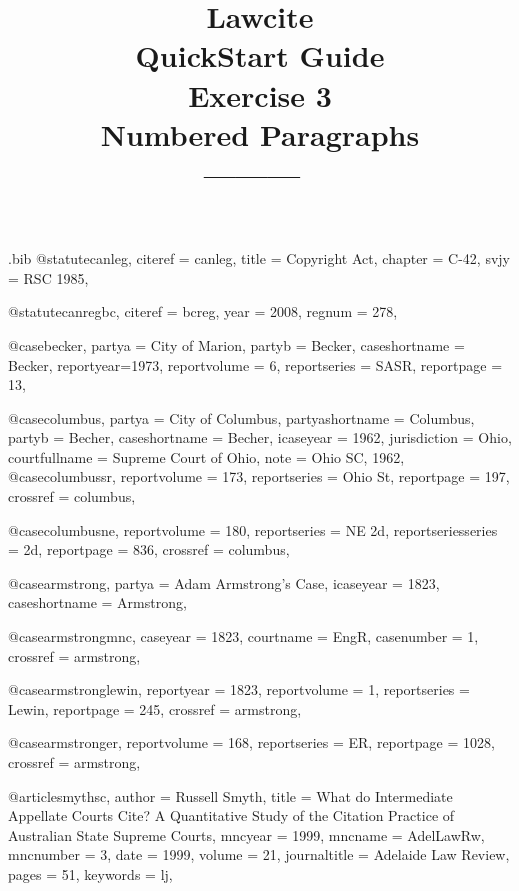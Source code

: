 \begin{filecontents*}[overwrite]{\jobname.bib}
@statute{canleg,
citeref = {canleg},
title = {Copyright Act},
chapter = {C-42},
svjy = {RSC 1985},
}



@statute{canregbc,
citeref = {bcreg},
year = {2008},
regnum = {278},
}

@case{becker,
  partya = {City of Marion}, 
  partyb = {Becker},
  caseshortname = {Becker},
  reportyear={1973},
  reportvolume = {6},
  reportseries = {SASR},
  reportpage = {13},
	}

@case{columbus,
  partya = {City of Columbus},
  partyashortname = {Columbus}, 
  partyb = {Becher},
  caseshortname = {Becher},
  icaseyear = {1962},
  jurisdiction = {Ohio},
  courtfullname = {Supreme Court of Ohio},
  note = {Ohio SC, 1962},
	}
@case{columbussr,
  reportvolume = {173},
  reportseries = {Ohio St},
  reportpage = {197},
  crossref = {columbus},
}

@case{columbusne,
  reportvolume = {180},
  reportseries = {NE 2d},
  reportseriesseries = {2d},
  reportpage = {836},
  crossref = {columbus},
}

@case{armstrong,
  partya = {Adam Armstrong's Case},
  icaseyear = {1823},
  caseshortname = {Armstrong},
	}

@case{armstrongmnc,
  caseyear = {1823},
  courtname = {EngR},
  casenumber = {1},
  crossref = {armstrong},
}


@case{armstronglewin,
  reportyear = {1823},
  reportvolume = {1},
  reportseries = {Lewin},
  reportpage = {245},
  crossref = {armstrong},
}

@case{armstronger,
  reportvolume = {168},
  reportseries = {ER},
  reportpage = {1028},
  crossref = {armstrong},
}

@article{smythsc,
author = {Russell Smyth},
title = {What do Intermediate Appellate Courts Cite? A Quantitative Study of the Citation Practice of Australian State Supreme Courts},
mncyear = {1999},
mncname = {AdelLawRw},
mncnumber = {3},
date = {1999},
volume = {21},
journaltitle = {Adelaide Law Review},
pages = {51},
keywords = {lj},
}



\end{filecontents*}

\documentclass[12pt]{article}
\title{Lawcite\\QuickStart Guide \\Exercise 3\\ Numbered Paragraphs\\[24pt]\normalsize \hfill ---------\hfill\ }
\author{}
\date{}
\newcommand\rulesep{\rule{0.4\textwidth}{.4pt}}
\usepackage[table]{xcolor}
\usepackage{fontspec}
\setmainfont{Noto Serif}
\setsansfont{Noto Sans}[Scale=0.9]
\setmonofont{Noto Sans Mono}[Colour=blue]
\newfontface{}
\newcommand\goodoh{{\large\ftmark 🗸}}
\newcommand\notsogoodoh{{\large\ftmark 🗶}}

